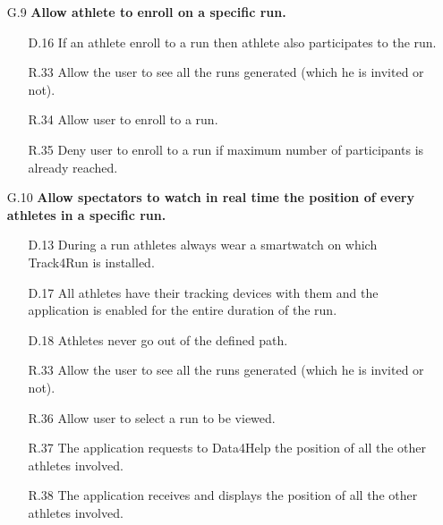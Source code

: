\begin{enumerate}
\begin{enumerate}
	\item [G.9] \textbf{Allow athlete to enroll on a specific run.}
		\begin{enumerate}
		\item [D.16] If an athlete enroll to a run then athlete also participates to the run.
		\item [R.33] Allow the user to see all the runs generated (which he is invited or not).
		\item [R.34] Allow user to enroll to a run.
		\item [R.35] Deny user to enroll to a run if maximum number of participants is already reached.
		\end{enumerate}
	
	\item [G.10] \textbf{Allow spectators to watch in real time the position of every athletes in a specific run.}
		\begin{enumerate}
		\item [D.13] During a run athletes always wear a smartwatch on which Track4Run is installed.
		\item [D.17] All athletes have their tracking devices with them and the application is enabled for the entire duration of the run.
		\item [D.18] Athletes never go out of the defined path.
		\item [R.33] Allow the user to see all the runs generated (which he is invited or not).
		\item [R.36] Allow user to select a run to be viewed.
		\item [R.37] The application requests to Data4Help the position of all the other athletes involved.
		\item [R.38] The application receives and displays the position of all the other athletes involved.
		\end{enumerate}
	\end{enumerate}

\end{enumerate}
\clearpage

